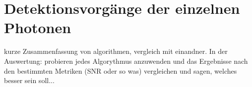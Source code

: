 \section{Detektionsvorgänge der einzelnen Photonen}
\label{text:single_photon_theorie}
kurze Zusammenfassung von algorithmen, vergleich mit einandner. In der Auswertung: probieren jedes Algorythmus anzuwenden und das Ergebnisse nach den bestimmten Metriken (SNR oder so was) vergleichen und sagen, welches besser sein soll...
